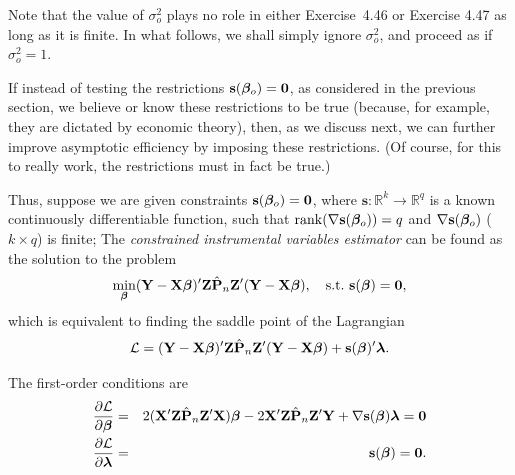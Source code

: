 Note that the value of $\sigma_o^2$ plays no role in either Exercise~4.46 or Exercise
4.47 as long as it is finite. In what follows, we shall simply ignore $\sigma_o^2$, and
proceed as if $\sigma_o^2 = 1$.

If instead of testing the restrictions $\mathbf{s}(\boldsymbol{\beta}_o) = \mathbf{0}$, as considered in the previous section, we believe or know these restrictions to be true (because,
for example, they are dictated by economic theory), then, as we discuss
next, we can further improve asymptotic efficiency by imposing these restrictions. (Of course, for this to really work, the restrictions must in fact
be true.)

Thus, suppose we are given constraints $\mathbf{s}(\boldsymbol{\beta}_o) = \mathbf{0}$, where $\mathbf{s} : \mathbb{R}^k \to \mathbb{R}^q$ is
a known continuously differentiable function, such that $\mathrm{rank}(\nabla \mathbf{s}(\boldsymbol{\beta}_o)) = q$
and $\nabla \mathbf{s}(\boldsymbol{\beta}_o)$ ($k \times q$) is finite; The \emph{constrained instrumental variables estimator} can be found as the solution to the problem
\[
\min_{\boldsymbol{\beta}} (\mathbf{Y} - \mathbf{X}\boldsymbol{\beta})'\mathbf{Z}\hat{\mathbf{P}}_n\mathbf{Z}'(\mathbf{Y} - \mathbf{X}\boldsymbol{\beta}), \quad \text{s.t.}\ \mathbf{s}(\boldsymbol{\beta}) = \mathbf{0},
\]
which is equivalent to finding the saddle point of the Lagrangian
\[
\mathcal{L} = (\mathbf{Y} - \mathbf{X}\boldsymbol{\beta})'\mathbf{Z}\hat{\mathbf{P}}_n\mathbf{Z}'(\mathbf{Y} - \mathbf{X}\boldsymbol{\beta}) + \mathbf{s}(\boldsymbol{\beta})'\boldsymbol{\lambda}.
\]

The first-order conditions are
\begin{eqnarray*}
\frac{\partial \mathcal{L}}{\partial \boldsymbol{\beta}} &=& 2(\mathbf{X}'\mathbf{Z}\hat{\mathbf{P}}_n\mathbf{Z}'\mathbf{X})\boldsymbol{\beta} - 2\mathbf{X}'\mathbf{Z}\hat{\mathbf{P}}_n\mathbf{Z}'\mathbf{Y} + \nabla \mathbf{s}(\boldsymbol{\beta})\boldsymbol{\lambda} = \mathbf{0}\\
\frac{\partial \mathcal{L}}{\partial \boldsymbol{\lambda}} &=& \mathbf{s}(\boldsymbol{\beta}) = \mathbf{0}.
\end{eqnarray*}

